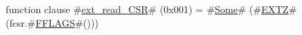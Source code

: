 function clause #\hyperref[sailRISCVzextzyreadzyCSR]{ext\_read\_CSR}# (0x001) = #\hyperref[sailRISCVzSome]{Some}# (#\hyperref[sailRISCVzEXTZ]{EXTZ}# (fcsr.#\hyperref[sailRISCVzFFLAGS]{FFLAGS}#()))
